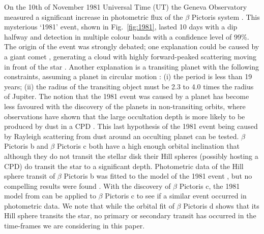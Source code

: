 \documentclass{aa}
\newcommand\picb{$\beta$ Pictoris b}
\newcommand\picc{$\beta$ Pictoris c}
\newcommand\picd{$\beta$ Pictoris d}
\newcommand\pic{$\beta$ Pictoris}
\begin{document}
	On the 10th of November 1981 Universal Time (UT) the Geneva Observatory measured a significant increase in photometric flux of the \pic{} system \citep{ Lecavelier_Des_Etangs_1995}.
	This mysterious `1981' event, shown in Fig.~\ref{fig:1981}, lasted 10 days with a dip halfway and detection in multiple colour bands with a confidence level of 99$\%$.
	The origin of the event was strongly debated; one explanation could be caused by a giant comet \citep{Lamers_1997}, generating a cloud with highly forward-peaked scattering moving in front of the star \citep{Lecavelier_Des_Etangs_1995, Lecavelier_Des_Etangs_1997}.
	Another explanation is a transiting planet with the following constraints, assuming a planet in circular motion \citep{Lecavelier_Des_Etangs_1997}: (i) the period is less than 19 years; (ii) the radius of the transiting object must be 2.3 to 4.0 times the radius of Jupiter.
	The notion that the 1981 event was caused by a planet has become less favoured with the discovery of the planets in non-transiting orbits, where observations have shown that the large occultation depth is more likely to be produced by dust in a CPD \citep{Lecavelier_des_Etangs_2008a, Lecavelier_des_Etangs_2008b}. 
	This last hypothesis of the 1981 event being caused by Rayleigh scattering from dust around an occulting planet can be tested. 
	\picb{} and \picc{} both have a high enough orbital inclination that although they do not transit the stellar disk \citep{Wang_2016} their Hill spheres (possibly hosting a CPD) do transit the star to a significant depth.
	Photometric data of the Hill sphere transit of \picb{} was fitted to the model of the 1981 event \citet[see Fig.~\ref{fig:1981}; ][]{Kenworthy_2021}, but no compelling results were found \citep{Lecavelier_Des_Etangs_2009,Kenworthy_2021}. 
	With the discovery of \picc{}, the 1981 model from \citet{Kenworthy_2021} can be applied to \picc{} to see if a similar event occurred in photometric data.
	We note that while the orbital fit of \picd{} \citep{2026arXiv260623801S} shows that its Hill sphere transits the star, no primary or secondary transit has occurred in the time-frames we are considering in this paper.
	
\end{document}
